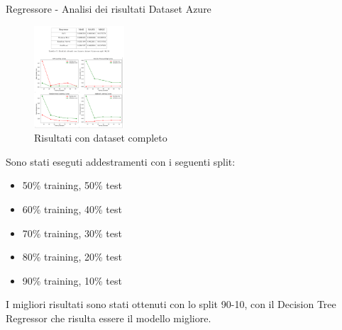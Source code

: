 \begin{frame}{Regressore - Analisi dei risultati Dataset Azure}
    \begin{figure}
    \centering
    \includegraphics[width=0.3\textwidth]{images/RisultatiRegAzure.png}
    \caption{Risultati con dataset completo}
\end{figure}
\small
Sono stati eseguti addestramenti con i seguenti split:
\begin{itemize}
    \item 50\% training, 50\% test
    \item 60\% training, 40\% test
    \item 70\% training, 30\% test
    \item 80\% training, 20\% test
    \item 90\% training, 10\% test
\end{itemize} 
I migliori risultati sono stati ottenuti con lo split 90-10, con il Decision Tree Regressor che risulta essere il modello migliore.
\end{frame}


